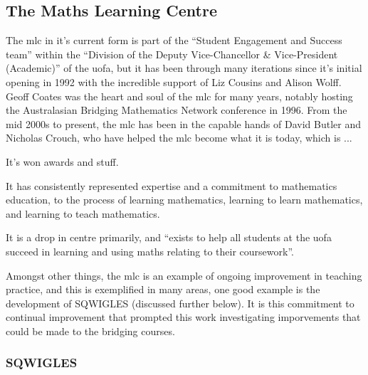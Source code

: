 \documentclass[twoside,12pt,a4paper]{report}
\begin{document}
\subsection{The Maths Learning Centre}

The \gls{mlc} in it's current form is part of the ``Student Engagement and Success team'' within the ``Division of the Deputy Vice-Chancellor \& Vice-President (Academic)'' of the \gls{uofa}, but it has been through many iterations since it's initial opening in 1992 with the incredible support of Liz Cousins and Alison Wolff. Geoff Coates was the heart and soul of the \gls{mlc} for many years, notably hosting the Australasian Bridging Mathematics Network conference in 1996. From the mid 2000s to present, the \gls{mlc} has been in the capable hands of David Butler and Nicholas Crouch, who have helped the \gls{mlc} become what it is today, which is ...

It's won awards and stuff.

It has consistently represented expertise and a commitment to mathematics education, to the process of learning mathematics, learning to learn mathematics, and learning to teach mathematics. 

It is a drop in centre primarily, and ``exists to help all students at the \gls{uofa} succeed in learning and using maths relating to their coursework''.

Amongst other things, the \gls{mlc} is an example of ongoing improvement in teaching practice, and this is exemplified in many areas, one good example is the development of SQWIGLES (discussed further below). It is this commitment to continual improvement that prompted this work investigating imporvements that could be made to the bridging courses.


\subsubsection{SQWIGLES}
\end{document}
